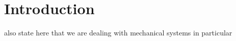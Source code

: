 \setcounter{chapter}{0}

\chapter{Introduction}

also state here that we are dealing with mechanical systems in particular